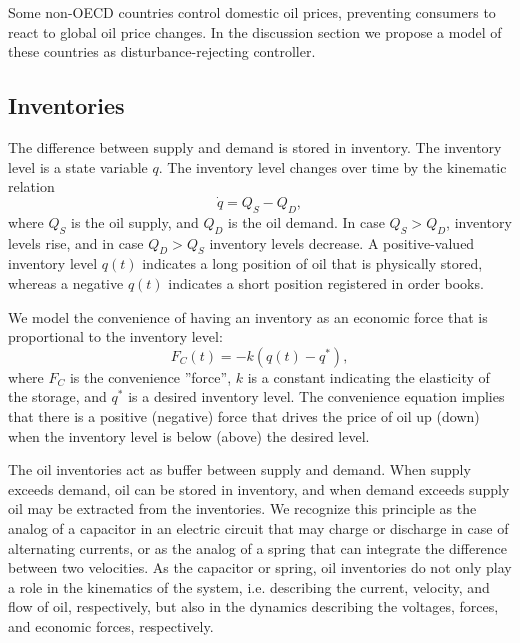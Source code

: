 Some non-OECD countries control domestic oil prices, preventing consumers to react to global oil price changes.
In the discussion section we propose a model of these countries as disturbance-rejecting controller.





\subsection{Inventories}
The difference between supply and demand is stored in inventory.
The inventory level is a state variable $q$.
The inventory level changes over time by the kinematic relation
\begin{equation}
    \dot{q} = Q_S-Q_D,
\end{equation}
where $Q_S$ is the oil supply, and $Q_D$ is the oil demand.
In case $Q_S>Q_D$, inventory levels rise, and in case $Q_D>Q_S$ inventory levels decrease.
A positive-valued inventory level $q(t)$ indicates a long position of oil that is physically stored, whereas a negative $q(t)$ indicates a short position registered in order books.

We model the convenience of having an inventory as an economic force that is proportional to the inventory level:
\begin{equation}
    F_C(t) = -k (q(t)-q^*),
\end{equation}
where $F_C$ is the convenience ''force'', $k$ is a constant indicating the elasticity of the storage, and $q^*$ is a desired inventory level.
The convenience equation implies that there is a positive (negative) force that drives the price of oil up (down) when the inventory level is below (above) the desired level. 

The oil inventories act as buffer between supply and demand.
When supply exceeds demand, oil can be stored in inventory, and when demand exceeds supply oil may be extracted from the inventories.
We recognize this principle as the analog of a capacitor in an electric circuit that may charge or discharge in case of alternating currents, or as the analog of a spring that can integrate the difference between two velocities.
As the capacitor or spring, oil inventories do not only play a role in the kinematics of the system, i.e. describing the current, velocity, and flow of oil, respectively, but also in the dynamics describing the voltages, forces, and economic forces, respectively.





